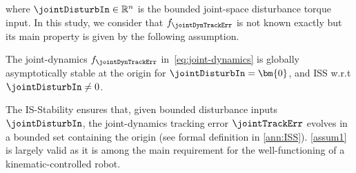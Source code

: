where  $\jointDisturbIn\in\mathbb{R}^n$ is the bounded joint-space disturbance torque input. In this study, we consider that $f_{\jointDynTrackErr}$ is not known exactly but its main property is given by the following assumption.
\begin{assumption}\label{assum1}
	The joint-dynamics $f_{\jointDynTrackErr}$ in~\cref{eq:joint-dynamics} is globally asymptotically stable at the origin for $\jointDisturbIn=\bm{0}$, and ISS w.r.t  $\jointDisturbIn\neq0$.
\end{assumption}%
The IS-Stability ensures that, given  bounded disturbance inputs $\jointDisturbIn$,  the joint-dynamics tracking error $\jointTrackErr$ evolves in a bounded set containing the origin (see formal definition in \cref{ann:ISS}).	
\cref{assum1} is largely valid as it is among the main requirement for the well-functioning of a kinematic-controlled robot.

